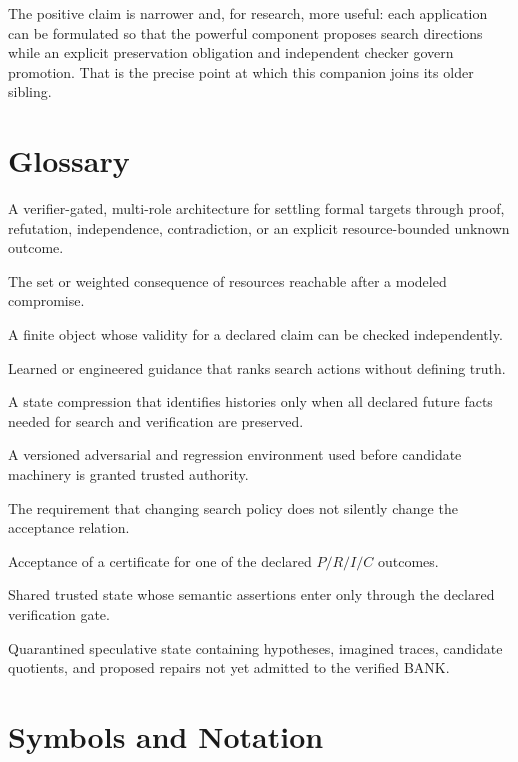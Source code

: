 \documentclass[11pt,oneside]{book}
\theoremstyle{definition}
\theoremstyle{remark}
\begin{document}
The positive claim is narrower and, for research, more useful: each application can be formulated so
that the powerful component proposes search directions while an explicit preservation obligation and
independent checker govern promotion. That is the precise point at which this companion joins its
older sibling.

\appendix
\chapter{Glossary}

\begin{description}[style=nextline,leftmargin=1.8em,labelindent=0pt]
\item[AMLD] A verifier-gated, multi-role architecture for settling formal targets through proof,
refutation, independence, contradiction, or an explicit resource-bounded unknown outcome.
\item[Blast radius] The set or weighted consequence of resources reachable after a modeled compromise.
\item[Certificate] A finite object whose validity for a declared claim can be checked independently.
\item[COMPASS] Learned or engineered guidance that ranks search actions without defining truth.
\item[Future-sufficient quotient] A state compression that identifies histories only when all declared
future facts needed for search and verification are preserved.
\item[Ocean] A versioned adversarial and regression environment used before candidate machinery is
granted trusted authority.
\item[Policy-neutral verification] The requirement that changing search policy does not silently change
the acceptance relation.
\item[Settlement] Acceptance of a certificate for one of the declared $P/R/I/C$ outcomes.
\item[Verified BANK] Shared trusted state whose semantic assertions enter only through the declared
verification gate.
\item[FUTUREBANK] Quarantined speculative state containing hypotheses, imagined traces, candidate
quotients, and proposed repairs not yet admitted to the verified BANK.
\end{description}

\chapter{Symbols and Notation}
\end{document}
